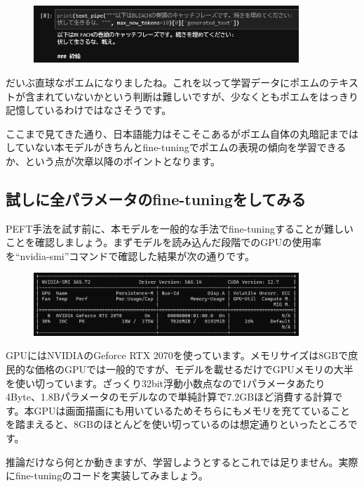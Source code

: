 \documentclass[a5paper,twoside,dvipdfmx]{jsarticle}
\begin{document}
\begin{figure}[h]
  \centering
  \includegraphics[width=100mm]{../C105Fig/gray/generate_2.png}
 \end{figure} 


だいぶ直球なポエムになりましたね。これを以って学習データにポエムのテキストが含まれていないかという判断は難しいですが、少なくともポエムをはっきり記憶しているわけではなさそうです。

ここまで見てきた通り、日本語能力はそこそこあるがポエム自体の丸暗記まではしていない本モデルがきちんとfine-tuningでポエムの表現の傾向を学習できるか、という点が次章以降のポイントとなります。

\subsection{試しに全パラメータのfine-tuningをしてみる}

PEFT手法を試す前に、本モデルを一般的な手法でfine-tuningすることが難しいことを確認しましょう。まずモデルを読み込んだ段階でのGPUの使用率を``nvidia-smi''コマンドで確認した結果が次の通りです。

\begin{figure}[h]
  \centering
  \includegraphics[width=100mm]{../C105Fig/gray/nvidia-smi.png}
 \end{figure} 

GPUにはNVIDIAのGeforce RTX 2070を使っています。メモリサイズは8GBで庶民的な価格のGPUでは一般的ですが、モデルを載せるだけでGPUメモリの大半を使い切っています。ざっくり32bit浮動小数点なので1パラメータあたり4Byte、1.8Bパラメータのモデルなので単純計算で7.2GBほど消費する計算です。本GPUは画面描画にも用いているためそちらにもメモリを充てていることを踏まえると、8GBのほとんどを使い切っているのは想定通りといったところです。

推論だけなら何とか動きますが、学習しようとするとこれでは足りません。実際にfine-tuningのコードを実装してみましょう。
\end{document}
